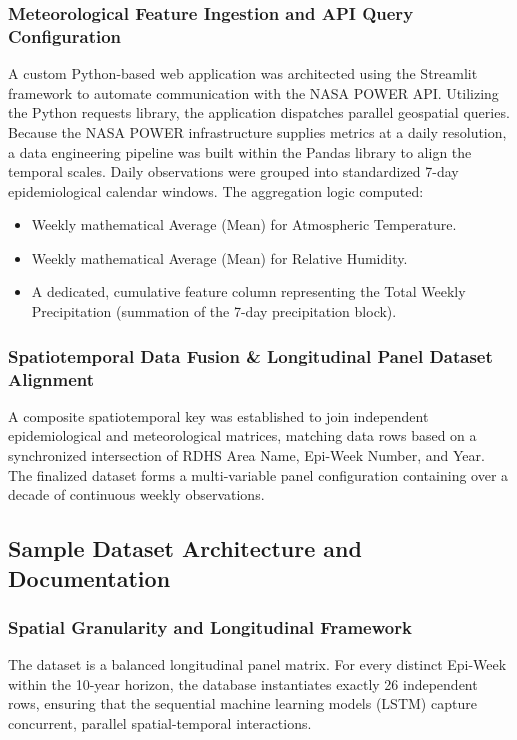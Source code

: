 \documentclass[12pt,a4paper]{article}
\begin{document}
\subsubsection{Meteorological Feature Ingestion and API Query Configuration}
A custom Python-based web application was architected using the Streamlit framework to automate communication with the NASA POWER API. Utilizing the Python requests library, the application dispatches parallel geospatial queries. Because the NASA POWER infrastructure supplies metrics at a daily resolution, a data engineering pipeline was built within the Pandas library to align the temporal scales. Daily observations were grouped into standardized 7-day epidemiological calendar windows. The aggregation logic computed:
\begin{itemize}
    \item Weekly mathematical Average (Mean) for Atmospheric Temperature.
    \item Weekly mathematical Average (Mean) for Relative Humidity.
    \item A dedicated, cumulative feature column representing the Total Weekly Precipitation (summation of the 7-day precipitation block).
\end{itemize}

\subsubsection{Spatiotemporal Data Fusion \& Longitudinal Panel Dataset Alignment}
A composite spatiotemporal key was established to join independent epidemiological and meteorological matrices, matching data rows based on a synchronized intersection of RDHS Area Name, Epi-Week Number, and Year. The finalized dataset forms a multi-variable panel configuration containing over a decade of continuous weekly observations.

\subsection{Sample Dataset Architecture and Documentation}
\subsubsection{Spatial Granularity and Longitudinal Framework}
The dataset is a balanced longitudinal panel matrix. For every distinct Epi-Week within the 10-year horizon, the database instantiates exactly 26 independent rows, ensuring that the sequential machine learning models (LSTM) capture concurrent, parallel spatial-temporal interactions.
\end{document}

